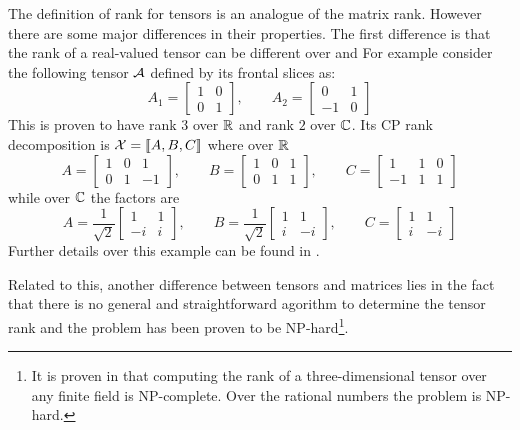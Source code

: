 The definition of rank for tensors is an analogue of the matrix rank. However there are some major differences in their properties.
The first difference is that the rank of a real-valued tensor can be different over \RR and \CC
For example consider the following tensor $\mathcal{A}$ defined by its frontal slices as:
\begin{equation*}
  A_1 = 
  \begin{bmatrix}
    1 & 0\\
    0 & 1
  \end{bmatrix}
  ,\qquad
  A_2 = 
  \begin{bmatrix}
    0 & 1\\
    -1 & 0
  \end{bmatrix}
\end{equation*}
This is proven to have rank $3$ over $\mathbb{R}$ and rank $2$ over $\mathbb{C}$. Its CP rank decomposition is $\mathcal{X} = \llbracket A, B, C \rrbracket$ where over $\mathbb{R}$
\begin{equation*}
  A = 
  \begin{bmatrix}
    1 & 0 & 1\\
    0 & 1 & -1
  \end{bmatrix}
  ,\qquad
  B = 
  \begin{bmatrix}
    1 & 0 & 1\\
    0 & 1 & 1
  \end{bmatrix}
  ,\qquad
  C = 
  \begin{bmatrix}
    1 & 1 & 0\\
    -1 & 1 & 1
  \end{bmatrix}
\end{equation*}
while over $\mathbb{C}$ the factors are
\begin{equation*}
  A = \frac{1}{\sqrt{2}}
  \begin{bmatrix}
    1 & 1\\
    -i & i
  \end{bmatrix}
  ,\qquad
  B = \frac{1}{\sqrt{2}}
  \begin{bmatrix}
    1 & 1\\
    i & -i
  \end{bmatrix}
  ,\qquad
  C = 
  \begin{bmatrix}
    1 & 1\\
    i & -i
  \end{bmatrix}
\end{equation*}
Further details over this example can be found in \cite{tensorreview,kruskalstatement,ten1991kruskal,kruskal1989rank}.

Related to this, another difference between tensors and matrices lies in the fact that there is no general and straightforward agorithm to determine the tensor rank and the problem has been proven to be NP-hard\cite{rankNP}\footnote{It is proven in \cite{rankNP} that computing the rank of a three-dimensional tensor over any finite field is NP-complete. Over the rational numbers the problem is NP-hard.}.

